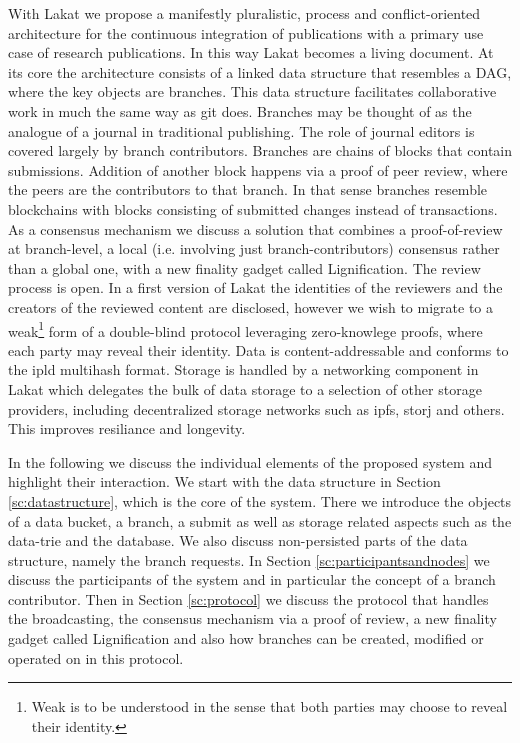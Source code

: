 With Lakat we propose a manifestly pluralistic, process and conflict-oriented architecture for the continuous integration of publications with a primary use case of research publications. In this way Lakat becomes a living document. At its core the architecture consists of a linked data structure that resembles a DAG, where the key objects are branches. This data structure facilitates collaborative work in much the same way as git does. Branches may be thought of as the analogue of a journal in traditional publishing. The role of journal editors is covered largely by branch contributors. Branches are chains of blocks that contain submissions. Addition of another block happens via a proof of peer review, where the peers are the contributors to that branch. In that sense branches resemble blockchains with blocks consisting of submitted changes instead of transactions. As a consensus mechanism we discuss a solution that combines a proof-of-review at branch-level, a local (i.e. involving just branch-contributors) consensus rather than a global one, with a new finality gadget called Lignification. The review process is open. In a first version of Lakat the identities of the reviewers and the creators of the reviewed content are disclosed, however we wish to migrate to a weak\footnote{Weak is to be understood in the sense that both parties may choose to reveal their identity.} form of a double-blind protocol leveraging zero-knowlege proofs, where each party may reveal their identity.
Data is content-addressable and conforms to the ipld multihash format. Storage is handled by a networking component in Lakat which delegates the bulk of data storage to a selection of other storage providers, including decentralized storage networks such as ipfs, storj and others. This improves resiliance and longevity. 

In the following we discuss the individual elements of the proposed system and highlight their interaction. We start with the data structure in Section \ref{sc:datastructure}, which is the core of the system. There we introduce the objects of a data bucket, a branch, a submit as well as storage related aspects such as the data-trie and the database. We also discuss non-persisted parts of the data structure, namely the branch requests. In Section \ref{sc:participantsandnodes} we discuss the participants of the system and in particular the concept of a branch contributor. 
Then in Section \ref{sc:protocol} we discuss the protocol that handles the broadcasting, the consensus mechanism via a proof of review, a new finality gadget called Lignification and also how branches can be created, modified or operated on in this protocol. 
